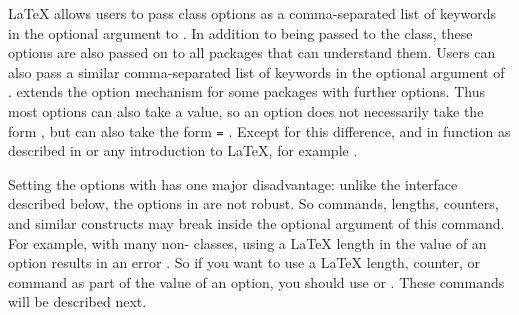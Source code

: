 \begin{Declaration}
\end{Declaration}
\LaTeX{} allows users to pass class options as a
comma-separated list of keywords in the optional argument to
. In addition to being passed to the class, these options
are also passed on to all packages that can
understand them. Users can also pass a similar comma-separated list of
keywords in the optional argument of . \KOMAScript{} extends the option mechanism for
 some packages with further options. Thus most \KOMAScript{} options can also
take a value, so an option does not necessarily take the form ,
but can also take the form \texttt{=}%
. Except for this difference,
 and  in \KOMAScript{} function as
described in \cite{latex:usrguide-historic} or any introduction to \LaTeX, for
example \cite{lshort}.


Setting the options with  has one
major disadvantage: unlike the interface described below, the options in
 are not robust. So commands, lengths, counters, and
similar constructs may break inside the optional argument of this command.
For example, with many non-\KOMAScript{} classes, using a \LaTeX{} length
in the value of an option results in an error%
%
. So if you want to use a \LaTeX{} length, counter, or command as part of the
value of an option, you should use  or
. These commands will be described next.%
%
\EndIndexGroup


